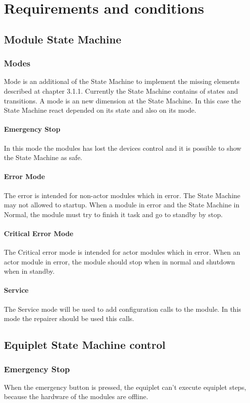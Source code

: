 \documentclass[12pt,a4paper]{report}
\begin{document}
\section{Requirements and conditions}
\subsection{Module State Machine}
\subsubsection{Modes}
Mode is an additional of the State Machine to implement the missing elements described at chapter 3.1.1.
Currently the State Machine contains of states and transitions. A mode is an new dimension at the State Machine. In this case the State Machine react depended on its state and also on its mode.
\paragraph{Emergency Stop}In this mode the modules has lost the devices control and it is possible to show the State Machine as safe.
\paragraph{Error Mode}The error is intended for non-actor modules which in error. The State Machine may not allowed to startup. When a module in error and the State Machine in Normal, the module must try to finish it task and go to standby by stop.
\paragraph{Critical Error Mode}The Critical error mode is intended for actor modules which in error. When an actor module in error, the module should stop when in normal and shutdown when in standby.
\paragraph{Service}The Service mode will be used to add configuration calls to the module. In this mode the repairer should be used this calls.
 
\subsection{Equiplet State Machine control}
\subsubsection{Emergency Stop}
When the emergency button is pressed, the equiplet can't execute equiplet steps, because the hardware of the modules are offline.
\end{document}
